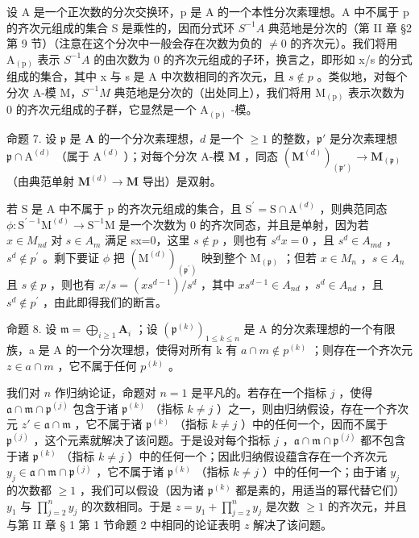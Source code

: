 设 A 是一个正次数的分次交换环，p 是 A 的一个本性分次素理想。A 中不属于 p 的齐次元组成的集合 S 是乘性的，因而分式环 \(S^{-1}A\) 典范地是分次的（第 II 章 §2 第 9 节）（注意在这个分次中一般会存在次数为负的 \(\neq0\) 的齐次元）。我们将用 \(\mathrm{A}_{(\mathrm{p})}\) 表示 \(S^{-1}A\) 的由次数为 0 的齐次元组成的子环，换言之，即形如 x/s 的分式组成的集合，其中 x 与 s 是 A 中次数相同的齐次元，且 \(s\notin p\) 。类似地，对每个分次 A-模 M，\(S^{-1}M\) 典范地是分次的（出处同上），我们将用 \(\mathrm{M}_{(\mathrm{p})}\) 表示次数为 0 的齐次元组成的子群，它显然是一个 \(\mathrm{A}_{(\mathrm{p})}\) -模。

命题 7. 设 \(\mathfrak{p}\) 是 \(\mathbf{A}\) 的一个分次素理想，\(d\) 是一个 \(\geqslant 1\) 的整数，\(\mathfrak{p}'\) 是分次素理想 \(\mathfrak{p} \cap \mathrm{A}^{(d)}\) （属于 \(\mathrm{A}^{(d)}\) ）；对每个分次 A-模 \(\mathbf{M}\) ，同态 \((\mathbf{M}^{(d)})_{(\mathfrak{p}')} \to \mathbf{M}_{(\mathfrak{p})}\) （由典范单射 \(\mathbf{M}^{(d)} \to \mathbf{M}\) 导出）是双射。

若 S 是 A 中不属于 p 的齐次元组成的集合，且 \(\mathrm{S}^{\prime}=\mathrm{S}\cap\mathrm{A}^{(d)}\) ，则典范同态 \(\phi:\mathrm{S}^{\prime-1}\mathrm{M}^{(d)}\to\mathrm{S}^{-1}\mathrm{M}\) 是一个次数为 0 的齐次同态，并且是单射，因为若 \(x\in M_{nd}\) 对 \(s\in A_{m}\) 满足 sx=0，这里 \(s\notin p\) ，则也有 \(s^{d}x=0\) ，且 \(s^{d}\in A_{md}\) ，\(s^{d}\notin p^{\prime}\) 。剩下要证 \(\phi\) 把 \((\mathrm{M}^{(d)})_{(\mathfrak{p}^{\prime})}\) 映到整个 \(\mathrm{M}_{(\mathfrak{p})}\) ；但若 \(x\in M_{n}\) ，\(s\in A_{n}\) 且 \(s\notin p\) ，则也有 \(x/s=(xs^{d-1})/s^{d}\) ，其中 \(xs^{d-1}\in A_{nd}\) ，\(s^{d}\in A_{nd}\) ，且 \(s^{d}\notin p^{\prime}\) ，由此即得我们的断言。

命题 8. 设 \(\mathfrak{m} = \bigoplus_{i\geqslant 1}\mathbf{A}_i\) ；设 \((\mathfrak{p}^{(k)})_{1\leqslant k\leqslant n}\) 是 A 的分次素理想的一个有限族，a 是 A 的一个分次理想，使得对所有 k 有 \(a \cap m \notin p^{(k)}\) ；则存在一个齐次元 \(z \in a \cap m\) ，它不属于任何 \(p^{(k)}\) 。

我们对 \(n\) 作归纳论证，命题对 \(n = 1\) 是平凡的。若存在一个指标 \(j\) ，使得 \(\mathfrak{a} \cap \mathfrak{m} \cap \mathfrak{p}^{(j)}\) 包含于诸 \(\mathfrak{p}^{(k)}\) （指标 \(k \neq j\) ）之一，则由归纳假设，存在一个齐次元 \(z' \in \mathfrak{a} \cap \mathfrak{m}\) ，它不属于诸 \(\mathfrak{p}^{(k)}\) （指标 \(k \neq j\) ）中的任何一个，因而不属于 \(\mathfrak{p}^{(j)}\) ，这个元素就解决了该问题。于是设对每个指标 \(j\) ，\(\mathfrak{a} \cap \mathfrak{m} \cap \mathfrak{p}^{(j)}\) 都不包含于诸 \(\mathfrak{p}^{(k)}\) （指标 \(k \neq j\) ）中的任何一个；因此归纳假设蕴含存在一个齐次元 \(y_j \in \mathfrak{a} \cap \mathfrak{m} \cap \mathfrak{p}^{(j)}\) ，它不属于诸 \(\mathfrak{p}^{(k)}\) （指标 \(k \neq j\) ）中的任何一个；由于诸 \(y_j\) 的次数都 \(\geqslant 1\) ，我们可以假设（因为诸 \(\mathfrak{p}^{(k)}\) 都是素的，用适当的幂代替它们）\(y_1\) 与 \(\prod_{j=2}^{n} y_j\) 的次数相同。于是 \(z = y_1 + \prod_{j=2}^{n} y_j\) 是次数 \(\geqslant 1\) 的齐次元，并且与第 II 章 § 1 第 1 节命题 2 中相同的论证表明 \(z\) 解决了该问题。

